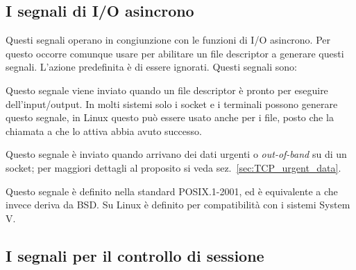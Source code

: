 \subsection{I segnali di I/O asincrono}
\label{sec:sig_asyncio}

Questi segnali operano in congiunzione con le funzioni di I/O asincrono. Per
questo occorre comunque usare  per abilitare un file descriptor a
generare questi segnali.  L'azione predefinita è di essere ignorati. Questi
segnali sono:
\begin{basedescript}{\desclabelwidth{2.0cm}}
\item[\signald{SIGIO}] Questo segnale viene inviato quando un file descriptor è
  pronto per eseguire dell'input/output. In molti sistemi solo i socket e i
  terminali possono generare questo segnale, in Linux questo può essere usato
  anche per i file, posto che la chiamata a  che lo attiva abbia
  avuto successo.

\item[\signald{SIGURG}] Questo segnale è inviato quando arrivano dei dati
  urgenti o \textit{out-of-band} su di un socket; per maggiori dettagli al
  proposito si veda sez.~\ref{sec:TCP_urgent_data}.

\item[\signald{SIGPOLL}] Questo segnale è definito nella standard POSIX.1-2001,
  ed è equivalente a  che invece deriva da BSD. Su Linux è
  definito per compatibilità con i sistemi System V.
\end{basedescript}


\subsection{I segnali per il controllo di sessione}
\label{sec:sig_job_control}

